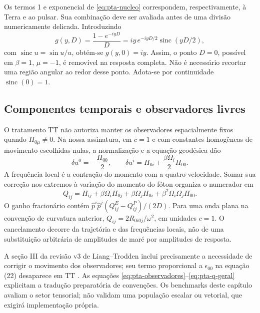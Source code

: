 Os termos 1 e exponencial de \eqref{eq:pta-nucleo} correspondem,
respectivamente, à Terra e ao pulsar. Sua combinação deve ser avaliada
antes de uma divisão numericamente delicada. Introduzindo
\begin{equation}
 g(y,D)=\frac{1-e^{-iyD}}{D}
       =iy\,e^{-iyD/2}\operatorname{sinc}(yD/2),
 \label{eq:pta-transferencia}
\end{equation}
com \(\operatorname{sinc}u=\sin u/u\), obtém-se
\(g(y,0)=iy\). Assim, o ponto \(D=0\), possível em
\(\beta=1\), \(\mu=-1\), é removível na resposta completa.
Não é necessário recortar uma região angular ao redor desse ponto.
Adota-se por continuidade \(\operatorname{sinc}(0)=1\).

\subsection{Componentes temporais e observadores livres}

O tratamento TT não autoriza manter os observadores espacialmente
fixos quando \(H_{0\mu}\ne0\). Na nossa assinatura, em \(c=1\)
e com constantes homogêneas de movimento escolhidas nulas, a
normalização e a equação geodésica dão
\begin{equation}
 \delta u^0=-\frac{H_{00}}2,\qquad
 \delta u^i=H_{0i}+\frac{\beta\Omega_i}{2}H_{00}.
 \label{eq:pta-observadores}
\end{equation}
A frequência local é a contração do momento com a quatro-velocidade.
Somar sua correção nos extremos à variação do momento do fóton
organiza o numerador em
\begin{equation}
 Q_{ij}=H_{ij}+\beta\Omega_iH_{0j}
              +\beta\Omega_jH_{0i}
              +\beta^2\Omega_i\Omega_jH_{00}.
 \label{eq:pta-q-geral}
\end{equation}
O ganho fracionário contém
\(\hat p^i\hat p^j(Q_{ij}^{E}-Q_{ij}^{P})/(2D)\).
Para uma onda plana na convenção de curvatura anterior,
\(Q_{ij}=2R_{0i0j}/\omega^2\), em unidades \(c=1\).
O cancelamento decorre da trajetória e das frequências locais, não de
uma substituição arbitrária de amplitudes de maré por amplitudes de
resposta.

A seção III da revisão v3 de Liang--Trodden inclui precisamente a
necessidade de corrigir o movimento dos observadores; seu termo
proporcional a \(\epsilon_{00}\) na equação (22) desaparece em TT
\autocite{liang2021}. As equações
\eqref{eq:pta-observadores}--\eqref{eq:pta-q-geral} explicitam a
tradução preparatória de convenções. Os benchmarks deste capítulo
avaliam o setor tensorial; não validam uma população escalar ou
vetorial, que exigirá implementação própria.

